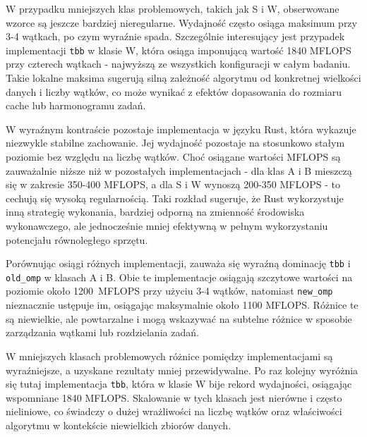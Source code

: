 W przypadku mniejszych klas problemowych, takich jak S i W, obserwowane wzorce są jeszcze bardziej nieregularne. Wydajność często osiąga maksimum przy 3-4 wątkach, po czym wyraźnie spada. Szczególnie interesujący jest przypadek implementacji \texttt{tbb} w klasie W, która osiąga imponującą wartość 1840 MFLOPS przy czterech wątkach - najwyższą ze wszystkich konfiguracji w całym badaniu. Takie lokalne maksima sugerują silną zależność algorytmu od konkretnej wielkości danych i liczby wątków, co może wynikać z efektów dopasowania do rozmiaru cache lub harmonogramu zadań.

W wyraźnym kontraście pozostaje implementacja w języku Rust, która wykazuje niezwykle stabilne zachowanie. Jej wydajność pozostaje na stosunkowo stałym poziomie bez względu na liczbę wątków. Choć osiągane wartości MFLOPS są zauważalnie niższe niż w pozostałych implementacjach - dla klas A i B mieszczą się w zakresie 350-400 MFLOPS, a dla S i W wynoszą 200-350 MFLOPS - to cechują się wysoką regularnością. Taki rozkład sugeruje, że Rust wykorzystuje inną strategię wykonania, bardziej odporną na zmienność środowiska wykonawczego, ale jednocześnie mniej efektywną w pełnym wykorzystaniu potencjału równoległego sprzętu.

Porównując osiągi różnych implementacji, zauważa się wyraźną dominację \texttt{tbb} i \texttt{old\_omp} w klasach A i B. Obie te implementacje osiągają szczytowe wartości na poziomie około \mbox{1200 MFLOPS} przy użyciu 3-4 wątków, natomiast \texttt{new\_omp} nieznacznie ustępuje im, osiągając maksymalnie około 1100 MFLOPS. Różnice te są niewielkie, ale powtarzalne i mogą wskazywać na subtelne różnice w sposobie zarządzania wątkami lub rozdzielania zadań.

W mniejszych klasach problemowych różnice pomiędzy implementacjami są wyraźniejsze, a uzyskane rezultaty mniej przewidywalne. Po raz kolejny wyróżnia się tutaj implementacja \texttt{tbb}, która w klasie W bije rekord wydajności, osiągając wspomniane 1840 MFLOPS. Skalowanie w tych klasach jest nierówne i często nieliniowe, co świadczy o dużej wrażliwości na liczbę wątków oraz właściwości algorytmu w kontekście niewielkich zbiorów danych.

